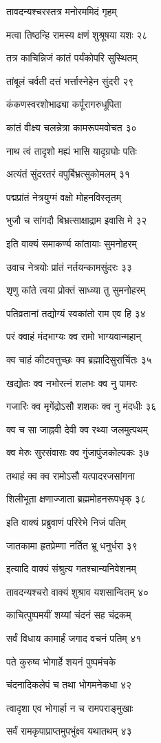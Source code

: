 तावदन्यश्चरस्तत्र मनोरममिदं गृहम्

मत्वा तिष्ठन्हि रामस्य क्षणं शुश्रूषया यशः २८

तत्र काचिन्निजं कांतं पर्यंकोपरि सुस्थितम्

तांबूलं चर्वती दत्तं भर्त्तास्नेहेन सुंदरी २९

कंकणस्वरशोभाढ्या कर्पूरागरुधूपिता

कांतं वीक्ष्य चलन्नेत्रा कामरूपमवोचत ३०

नाथ त्वं तादृशो मह्यं भासि यादृग्रघोः पतिः

अत्यंतं सुंदरतरं वपुर्बिभ्रत्सुकोमलम् ३१

पद्मप्रांतं नेत्रयुग्मं वक्षो मोहनविस्तृतम्

भुजौ च सांगदौ बिभ्रत्साक्षाद्राम इवासि मे ३२

इति वाक्यं समाकर्ण्य कांतायाः सुमनोहरम्

उवाच नेत्रयोः प्रांतं नर्तयन्कामसुंदरः ३३

शृणु कांते त्वया प्रोक्तं साध्व्या तु सुमनोहरम्

पतिव्रतानां तद्योग्यं स्वकांतो राम एव हि ३४

परं क्वाहं मंदभाग्यः क्व रामो भाग्यवान्महान्

क्व चाहं कीटवत्तुच्छः क्व ब्रह्मादिसुरार्चितः ३५

खद्योतः क्व नभोरत्नं शलभः क्व नु पामरः

गजारिः क्व मृगेंद्रोऽसौ शशकः क्व नु मंदधीः ३६

क्व च सा जाह्नवी देवी क्व रथ्या जलमुत्पथम्

क्व मेरुः सुरसंवासः क्व गुंजापुंजकोल्पकः ३७

तथाहं क्व क्व रामोऽसौ यत्पादरजसांगना

शिलीभूता क्षणाज्जाता ब्रह्ममोहनरूपधृक् ३८

इति वाक्यं प्रब्रुवाणं परिरेभे निजं पतिम्

जातकामा हृतप्रेम्णा नर्तित भ्रू धनुर्धरा ३९

इत्यादि वाक्यं संश्रुत्य गतश्चान्यनिवेशनम्

तावदन्यश्चरो वाक्यं शुश्राव यशसान्वितम् ४०

काचित्पुष्पमयीं शय्यां चंदनं सह चंद्रकम्

सर्वं विधाय कामार्हं जगाद वचनं पतिम् ४१

पते कुरुष्व भोगार्हे शयनं पुष्पमंचके

चंदनादिकलेपं च तथा भोगमनेकधा ४२

त्वादृशा एव भोगार्हा न च रामपराङ्मुखाः

सर्वं रामकृपाप्राप्तमुपभुंक्ष्व यथातथम् ४३

